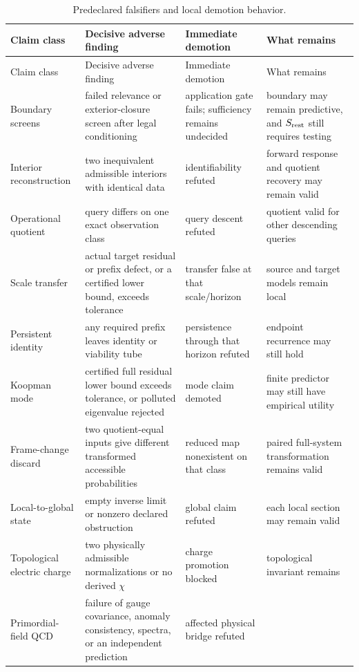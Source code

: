 \documentclass[11pt,a4paper]{article}
\theoremstyle{definition}
\theoremstyle{plain}
\theoremstyle{remark}
\begin{document}
\begingroup
\small
\begin{longtable}{L{0.19\textwidth}L{0.25\textwidth}L{0.22\textwidth}L{0.23\textwidth}}
\caption{Predeclared falsifiers and local demotion behavior.}
\label{tab:falsifiers}\\
\toprule
Claim class & Decisive adverse finding & Immediate demotion & What remains\\
\midrule
\endfirsthead
\toprule
Claim class & Decisive adverse finding & Immediate demotion & What remains\\
\midrule
\endhead
Boundary screens & failed relevance or exterior-closure screen after legal
conditioning & application gate fails; sufficiency remains undecided &
boundary may remain predictive, and \(S_{\rm rest}\) still requires testing\\
Interior reconstruction & two inequivalent admissible interiors with identical
data & identifiability refuted & forward response and quotient recovery may
remain valid\\
Operational quotient & query differs on one exact observation class & query
descent refuted & quotient valid for other descending queries\\
Scale transfer & actual target residual or prefix defect, or a certified lower
bound, exceeds tolerance & transfer false at that scale/horizon & source and
target models remain local\\
Persistent identity & any required prefix leaves identity or viability tube &
persistence through that horizon refuted & endpoint recurrence may still hold\\
Koopman mode & certified full residual lower bound exceeds tolerance, or
polluted eigenvalue rejected & mode claim demoted & finite predictor may still
have empirical utility\\
Frame-change discard & two quotient-equal inputs give different
transformed accessible probabilities & reduced map nonexistent on that class &
paired full-system transformation remains valid\\
Local-to-global state & empty inverse limit or nonzero declared obstruction &
global claim refuted & each local section may remain valid\\
Topological electric charge & two physically admissible normalizations or no
derived \(\chi\) & charge promotion blocked & topological invariant remains\\
Primordial-field QCD & failure of gauge covariance, anomaly consistency,
spectra, or an independent prediction & affected physical bridge refuted &

\end{longtable}
\end{document}
